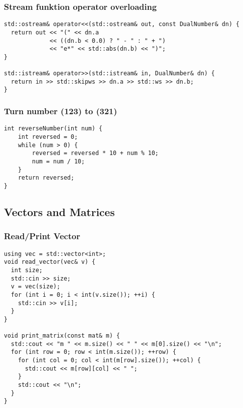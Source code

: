 \subsubsection{Stream funktion operator overloading }
\begin{lstlisting}[style = codeexpert]
std::ostream& operator<<(std::ostream& out, const DualNumber& dn) {
  return out << "(" << dn.a 
             << ((dn.b < 0.0) ? " - " : " + ") 
             << "e*" << std::abs(dn.b) << ")";
}

std::istream& operator>>(std::istream& in, DualNumber& dn) {
  return in >> std::skipws >> dn.a >> std::ws >> dn.b;
}
\end{lstlisting}

\subsubsection{Turn number (123) to (321)}
\begin{lstlisting}[style = codeexpert]
int reverseNumber(int num) {
    int reversed = 0;
    while (num > 0) {
        reversed = reversed * 10 + num % 10;
        num = num / 10;
    }
    return reversed;
}
\end{lstlisting}


\subsection{Vectors and Matrices}
\subsubsection{Read/Print Vector}
\begin{lstlisting}[style = codeexpert]
using vec = std::vector<int>;
void read_vector(vec& v) {
  int size;
  std::cin >> size;
  v = vec(size);
  for (int i = 0; i < int(v.size()); ++i) {
    std::cin >> v[i];
  }
}

void print_matrix(const mat& m) {
  std::cout << "m " << m.size() << " " << m[0].size() << "\n";
  for (int row = 0; row < int(m.size()); ++row) {
    for (int col = 0; col < int(m[row].size()); ++col) {
      std::cout << m[row][col] << " ";
    }
    std::cout << "\n";
  }
}
\end{lstlisting}

